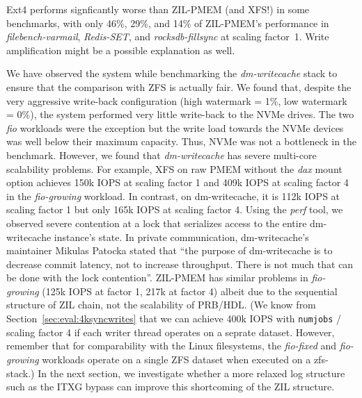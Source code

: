 \documentclass[12pt,a4paper,twoside]{book}
\begin{document}
Ext4 performs signficantly worse than ZIL-PMEM (and XFS!) in some benchmarks, with only 46\%, 29\%, and 14\% of ZIL-PMEM's performance in \textit{filebench-varmail}, \textit{Redis-SET}, and \textit{rocksdb-fillsync} at scaling factor~1.
Write amplification might be a possible explanation as well.

We have observed the system while benchmarking the \textit{dm-writecache} stack to ensure that the comparison with ZFS is actually fair.
We found that, despite the very aggressive write-back configuration (high watermark = 1\%, low watermark = 0\%), the system performed very little write-back to the NVMe drives.
The two \textit{fio} workloads were the exception but the write load towards the NVMe devices was well below their maximum capacity.
Thus, NVMe was not a bottleneck in the benchmark.
However, we found that \textit{dm-writecache} has severe multi-core scalability problems.
For example, XFS on raw PMEM without the \textit{dax} mount option achieves 150k IOPS at scaling factor 1 and 409k IOPS at scaling factor 4 in the \textit{fio-growing} workload.
In contrast, on dm-writecache, it is 112k IOPS at scaling factor 1 but only 165k IOPS at scaling factor 4.
Using the \textit{perf} tool, we observed severe contention at a lock that serializes access to the entire dm-writecache instance's state.
In private communication, dm-writecache's maintainer Mikulas Patocka stated that ``the purpose of dm-writecache is to decrease commit latency, not to increase throughput. There is not much that can be done with the lock contention''.
ZIL-PMEM has similar problems in \textit{fio-growing} (125k IOPS at factor 1, 217k at factor 4) albeit due to the sequential structure of ZIL chain, not the scalability of PRB/HDL.
(We know from Section~\ref{sec:eval:4ksyncwrites} that we can achieve 400k IOPS with \lstinline{numjobs} / scaling factor 4 if each writer thread operates on a seprate dataset.
 However, remember that for comparability with the Linux filesystems, the \textit{fio-fixed} and \textit{fio-growing} workloads operate on a single ZFS dataset when executed on a zfs-\* stack.)
In the next section, we investigate whether a more relaxed log structure such as the ITXG bypass can improve this shortcoming of the ZIL structure.

\end{document}
